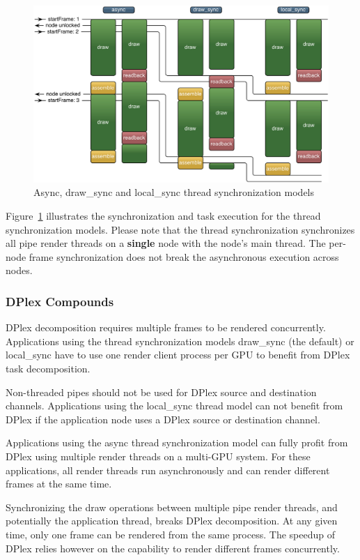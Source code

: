\documentclass[10pt,a4]{scrartcl}
\newcommand{\fig}[1]{Figure~\ref{#1}}
\begin{document}
\begin{figure}[ht!]\center
  \includegraphics[width=.9\textwidth]{images/threadModels.pdf}
  {\caption{\small\label{fThreadModels}Async, draw\_sync and local\_sync
    thread synchronization models}}
\end{figure}

\fig{fThreadModels} illustrates the synchronization and task execution
for the thread synchronization models. Please note that the thread
synchronization synchronizes all pipe render threads on a
\textbf{single} node with the node's main thread. The per-node frame
synchronization does not break the asynchronous execution across
nodes.


\subsubsection{\label{sAdvDPlex}DPlex Compounds}

DPlex decomposition requires multiple frames to be rendered
concurrently. Applications using the thread synchronization models
\textsf{draw\_sync} (the default) or \textsf{local\_sync} have to use
one render client process per GPU to benefit from DPlex task
decomposition.

Non-threaded pipes should not be used for DPlex source and destination
channels. Applications using the \textsf{local\_sync} thread model can
not benefit from DPlex if the application node uses a DPlex source or
destination channel.

Applications using the \textsf{async} thread synchronization model can
fully profit from DPlex using multiple render threads on a multi-GPU
system. For these applications, all render threads run asynchronously
and can render different frames at the same time.

Synchronizing the draw operations between multiple pipe render threads,
and potentially the application thread, breaks DPlex decomposition. At
any given time, only one frame can be rendered from the same
process. The speedup of DPlex relies however on the capability to
render different frames concurrently.
\end{document}

